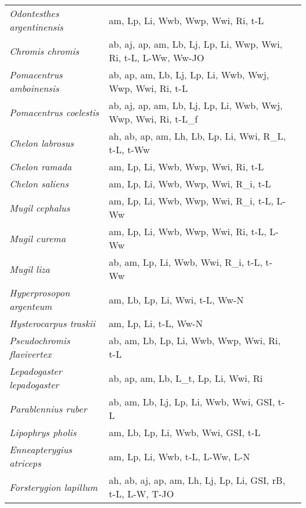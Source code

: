 {\begin{longtable}[c]{p{3.5cm}p{5.5cm}p{5.5cm}}
\emph{Odontesthes argentinensis} &  am, Lp, Li, Wwb, Wwp, Wwi, Ri, t-L & \citet{LlomCola2013,EPA2002} \\
\emph{Chromis chromis} &  ab, aj, ap, am, Lb, Lj, Lp, Li, Wwp, Wwi, Ri, t-L, L-Ww, Ww-JO & \citet{King1985,MacpRave2005,DulcKral1994,DulcKral1995,Ales2014,VallBayl2003,DulcSold2005,Giac2016} \\
\emph{Pomacentrus amboinensis} &  ab, ap, am, Lb, Lj, Lp, Li, Wwb, Wwj, Wwp, Wwi, Ri, t-L & \citet{MurpLeis2007,KingOCal2017,JoneMcCo2002} \\
\emph{Pomacentrus coelestis} &  ab, aj, ap, am, Lb, Lj, Lp, Li, Wwb, Wwj, Wwp, Wwi, Ri, t-L\_f & \citet{KingOCal2017} \\
\emph{Chelon labrosus} &  ah, ab, ap, am, Lh, Lb, Lp, Li, Wwi, R\_L, t-L, t-Ww & \citet{ZouiKhem2008,Leij2006} \\
\emph{Chelon ramada} &  am, Lp, Li, Wwb, Wwp, Wwi, Ri, t-L & \citet{KoutSini1994} \\
\emph{Chelon saliens} &  am, Lp, Li, Wwb, Wwp, Wwi, R\_i, t-L & \citet{KoutSini1994} \\
\emph{Mugil cephalus} &  am, Lp, Li, Wwb, Wwp, Wwi, R\_i, t-L, L-Ww & \citet{AguiGall1999} \\
\emph{Mugil curema} &  am, Lp, Li, Wwb, Wwp, Wwi, Ri, t-L, L-Ww & \citet{AguiGall1999} \\
\emph{Mugil liza} &  ab, am, Lp, Li, Wwb, Wwi, R\_i, t-L, t-Ww & \citet{MontBone2001,GarbCast2014} \\
\emph{Hyperprosopon argenteum} &  am, Lb, Lp, Li, Wwi, t-L, Ww-N & \citet{DeMaMoor1983} \\
\emph{Hysterocarpus traskii} &  am, Lp, Li, t-L, Ww-N & \citet{Bund1970} \\
\emph{Pseudochromis flavivertex} &  ab, am, Lb, Lp, Li, Wwb, Wwp, Wwi, Ri, t-L & \citet{OlivRoll2006,MiesGuth2004} \\
\emph{Lepadogaster lepadogaster} &  ab, ap, am, Lb, L\_t, Lp, Li, Wwi, Ri & \citet{TojeFari2012} \\
\emph{Parablennius ruber} &  ab, am, Lb, Lj, Lp, Li, Wwb, Wwi, GSI, t-L & \citet{FariGil2010,AzevHome2002} \\
\emph{Lipophrys pholis} &  am, Lb, Lp, Li, Wwb, Wwi, GSI, t-L & \citet{FariAlma1996,CarvMore2012} \\
\emph{Enneapterygius atriceps} &  am, Lp, Li, Wwb, t-L, L-Ww, L-N & \citet{LongLang2005} \\
\emph{Forsterygion lapillum} &  ah, ab, aj, ap, am, Lh, Lj, Lp, Li, GSI, rB, t-L, L-W, T-JO & \citet{ShimSwea2009,Fran2001,Fric1994,McDeShim2006,Mens2014,TaylWill1998,Nage2017,Foch2018,KhanHerb2012,McArHick2017} \\

\end{longtable}}
